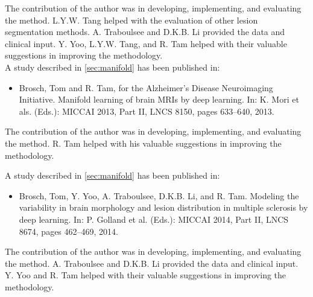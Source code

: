 The contribution of the author was in developing, implementing, and evaluating
the method. L.Y.W. Tang helped with the evaluation of other lesion segmentation
methods. A. Traboulsee and D.K.B. Li provided the data and clinical input. Y.
Yoo, L.Y.W. Tang, and R. Tam helped with their valuable suggestions in improving
the methodology.
\\[1em]
A study described in \ref{sec:manifold} has been published in:
\begin{itemize}
\item Brosch, Tom and R. Tam, for the Alzheimer's Disease Neuroimaging
Initiative. Manifold learning of brain MRIs by deep learning. In: K. Mori et
als. (Eds.): MICCAI 2013, Part II, LNCS 8150, pages 633--640, 2013.
\end{itemize}
The contribution of the author was in developing, implementing, and evaluating
the method. R. Tam helped with his valuable suggestions in improving the
methodology.

\clearpage
\noindent A study described in \ref{sec:manifold} has been published in:
\begin{itemize}
\item Brosch, Tom, Y. Yoo, A. Traboulsee, D.K.B. Li, and R. Tam. Modeling the
variability in brain morphology and lesion distribution in multiple sclerosis by
deep learning. In: P. Golland et al. (Eds.): MICCAI 2014, Part II, LNCS 8674,
pages 462--469, 2014.
\end{itemize}
The contribution of the author was in developing, implementing, and evaluating
the method. A. Traboulsee and D.K.B. Li provided the data and clinical input.
Y. Yoo and R. Tam helped with their valuable suggestions in improving the
methodology.
